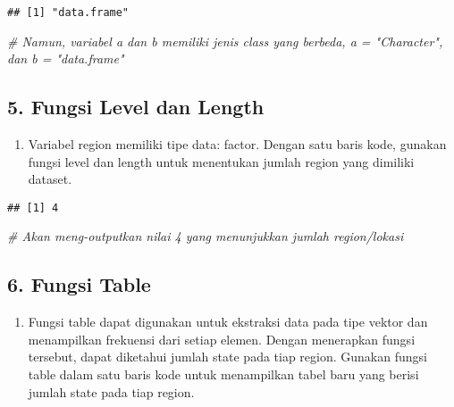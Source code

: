 \documentclass[
]{article}
\newenvironment{Shaded}{\begin{snugshade}}{\end{snugshade}}
\newcommand{\CommentTok}[1]{\textcolor[rgb]{0.56,0.35,0.01}{\textit{#1}}}
\newcommand{\FunctionTok}[1]{\textcolor[rgb]{0.00,0.00,0.00}{#1}}
\newcommand{\NormalTok}[1]{#1}
\newcommand{\SpecialCharTok}[1]{\textcolor[rgb]{0.00,0.00,0.00}{#1}}
\providecommand{\tightlist}{%
  \setlength{\itemsep}{0pt}\setlength{\parskip}{0pt}}
\begin{document}
\begin{verbatim}
## [1] "data.frame"
\end{verbatim}

\begin{Shaded}
\begin{Highlighting}[]
\CommentTok{\# Namun, variabel a dan b memiliki jenis class yang berbeda, a = "Character", dan b = "data.frame"}
\end{Highlighting}
\end{Shaded}

\hypertarget{fungsi-level-dan-length}{%
\subsection{5. Fungsi Level dan Length}\label{fungsi-level-dan-length}}

\begin{enumerate}
\def\labelenumi{\arabic{enumi}.}
\setcounter{enumi}{4}
\tightlist
\item
  Variabel region memiliki tipe data: factor. Dengan satu baris kode,
  gunakan fungsi level dan length untuk menentukan jumlah region yang
  dimiliki dataset.
\end{enumerate}

\begin{Shaded}
\end{Shaded}

\begin{verbatim}
## [1] 4
\end{verbatim}

\begin{Shaded}
\begin{Highlighting}[]
\CommentTok{\# Akan meng{-}outputkan nilai 4 yang menunjukkan jumlah region/lokasi}
\end{Highlighting}
\end{Shaded}

\hypertarget{fungsi-table}{%
\subsection{6. Fungsi Table}\label{fungsi-table}}

\begin{enumerate}
\def\labelenumi{\arabic{enumi}.}
\setcounter{enumi}{5}
\tightlist
\item
  Fungsi table dapat digunakan untuk ekstraksi data pada tipe vektor dan
  menampilkan frekuensi dari setiap elemen. Dengan menerapkan fungsi
  tersebut, dapat diketahui jumlah state pada tiap region. Gunakan
  fungsi table dalam satu baris kode untuk menampilkan tabel baru yang
  berisi jumlah state pada tiap region.
\end{enumerate}
\end{document}
